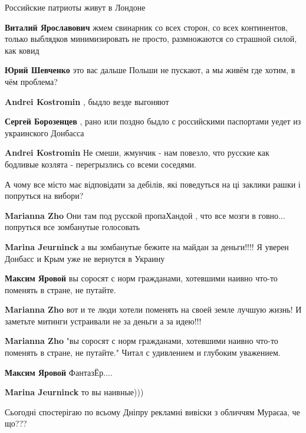 \begin{itemize}
\begin{itemize}
Российские патриоты живут в Лондоне

\textbf{Виталий Ярославович} жмем свинарник со всех сторон, со всех континентов, только выблядков минимизировать не просто, размножаются со страшной силой, как ковид

\textbf{Юрий Шевченко} это вас дальше Польши не пускают, а мы живём где хотим, в чём проблема?

\textbf{Andrei Kostromin} , быдло везде выгоняют

\textbf{Сергей Борозенцев} , рано или поздно быдло с российскими паспортами уедет из украинского Донбасса

\textbf{Andrei Kostromin} Не смеши, жмунчик - нам повезло, что русские как бодливые козлята - перегрызлись со всеми соседями.
\end{itemize} %

А чому все місто має відповідати за дебілів, які поведуться на ці заклики рашки
і попруться на вибори?

\begin{itemize} %
\textbf{Marianna Zho} Они там под русской пропаХандой , что все мозги в говно... попруться все зомбанутые голосовать

\textbf{Marina Jeurninck} а вы зомбанутые бежите на майдан за деньги!!!! Я уверен Донбасс и Крым уже не вернутся в Украину

\textbf{Максим Яровой} вы соросят с норм гражданами, хотевшими наивно что-то поменять в стране, не путайте.

\textbf{Marianna Zho} вот и те люди хотели поменять на своей земле лучшую жизнь! И заметьте митинги устраивали не за деньги а за идею!!!

\textbf{Marianna Zho} "вы соросят с норм гражданами, хотевшими наивно что-то поменять в стране, не путайте." Читал с удивлением и глубоким уважением.

\textbf{Максим Яровой} ФантазЁр....

\textbf{Marina Jeurninck} то вы наивные)))
\end{itemize} %

Сьогодні спостерігаю по всьому Дніпру рекламні вивіски з обличчям Мураєаа, че що???


\end{itemize}
